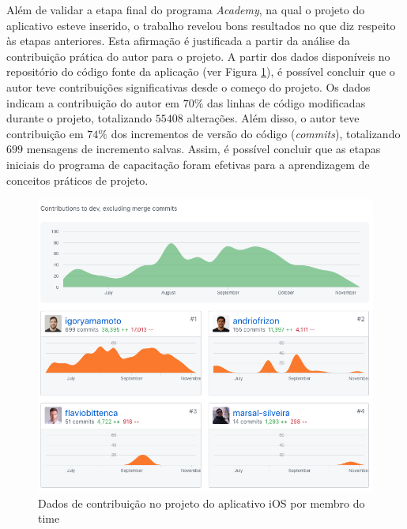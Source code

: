 Além de validar a etapa final do programa \textit{Academy}, na qual o projeto do aplicativo esteve inserido, o trabalho revelou bons resultados no que diz respeito às etapas anteriores. Esta afirmação é justificada a partir da análise da contribuição prática do autor para o projeto. A partir dos dados disponíveis no repositório do código fonte da aplicação (ver Figura \ref{fig:github-stats}), é possível concluir que o autor teve contribuições significativas desde o começo do projeto. Os dados indicam a contribuição do autor em $70\%$ das linhas de código modificadas durante o projeto, totalizando $55408$ alterações. Além disso, o autor teve contribuição em $74\%$ dos incrementos de versão do código (\textit{commits}), totalizando $699$ mensagens de incremento salvas. Assim, é possível concluir que as etapas iniciais do programa de capacitação foram efetivas para a aprendizagem de conceitos práticos de projeto.
\begin{figure}[H]
    \centering
    \includegraphics[width=\textwidth]{pfc/figuras/github-stats.png}
    \caption{Dados de contribuição no projeto do aplicativo iOS por membro do time}
    \label{fig:github-stats}
\end{figure}
